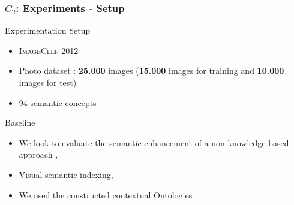 \begin{frame}
	\frametitle{$C_{2}$: Experiments - Setup}
	\begin{exampleblock}{Experimentation Setup}
		{\small
		\begin{itemize}		
			\item \textsc{ImageClef 2012}
			\item Photo dataset : \alert{\textbf{25.000}} images (\textbf{15.000} images for training 
				and \textbf{10.000} images for test)
			\item  \alert{94} semantic concepts
		\end{itemize}
		}
	\end{exampleblock}

	\begin{exampleblock}{Baseline}
		{\small
		\begin{itemize}
			\item We look to evaluate the semantic enhancement of a non knowledge-based approach 
			    \alert{\citep{Ksibi2012}},
			\item \alert{Visual} semantic indexing,
			\item We used the constructed \alert{contextual Ontologies}
		 \end{itemize}
		}
	\end{exampleblock}
\end{frame}


